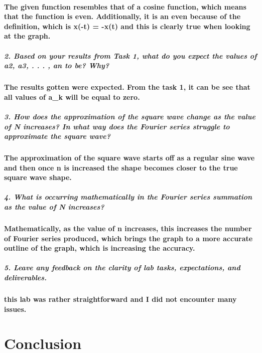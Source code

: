 \documentclass[12pt,a4paper]{article}
\begin{document}
\paragraph{The given function resembles that of a cosine function, which means that the function is even. Additionally, it is an even because of the definition, which is x(-t) = -x(t) and this is clearly true when looking at the graph.}


\subparagraph{\large 2. Based on your results from Task 1, what do you expect the values of a2, a3, . . . , an to be? Why?}

\paragraph{The results gotten were expected. From the task 1, it can be see that all values of a_{k} will be equal to zero.}

\subparagraph{\large 3. How does the approximation of the square wave change as the value of N increases? In what way does the Fourier series struggle to approximate the square wave? }

\paragraph{The approximation of the square wave starts off as a regular sine wave and then once n is increased the shape becomes closer to the true square wave shape.}

\subparagraph{\large 4. What is occurring mathematically in the Fourier series summation as the value of N increases?}

\paragraph{Mathematically, as the value of n increases, this increases the number of Fourier series produced, which brings the graph to a more accurate outline of the graph, which is increasing the accuracy.}

\subparagraph{\large 5. Leave any feedback on the clarity of lab tasks, expectations, and deliverables.}

\paragraph{this lab was rather straightforward and I did not encounter many issues.}

\section{Conclusion}\label{sec:res}
\end{document}
